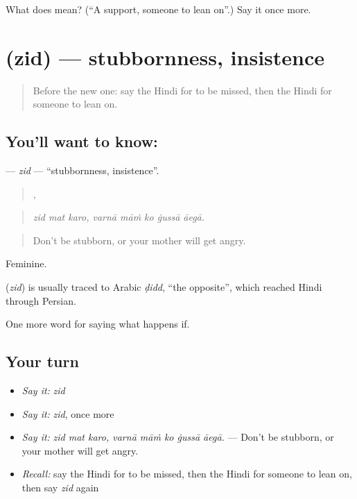 \begin{tcolorbox}[breakable,colback=teal!4,colframe=teal!35!black,title={Before you move on}]
What does  mean? (\textquotedblleft{}A support, someone to lean on\textquotedblright{}.) Say it once more.
\end{tcolorbox}
\section[\texorpdfstring{\hi{ज़िद} (zid)}{ज़िद (zid)}]{ (zid) — stubbornness, insistence}

\label{lesson:HI-C386-zid}



\begin{quote}
Before the new one: say the Hindi for to be missed, then the Hindi for someone to lean on.
\end{quote}

\subsection*{You'll want to know: }
\textbf{} — \emph{zid} — \textquotedblleft{}stubbornness, insistence\textquotedblright{}.

\begin{quote}
  ,     
\end{quote}

\begin{quote}
\emph{zid mat karo, varnā māṁ ko ġussā āegā.}
\end{quote}

\begin{quote}
Don't be stubborn, or your mother will get angry.
\end{quote}

Feminine.

\begin{cousinweb}
\textbf{} (\emph{zid}) is usually traced to Arabic \emph{ḍidd}, \textquotedblleft{}the opposite\textquotedblright{}, which reached Hindi through Persian.
\end{cousinweb}

\begin{grammarlens}[title={What you've built}]
One more word for saying what happens if.
\end{grammarlens}

\subsection*{Your turn}
\begin{itemize}
\raggedright
  \item \emph{Say it:} \emph{zid}
  \item \emph{Say it:} \emph{zid}, once more
  \item \emph{Say it:} \emph{zid mat karo, varnā māṁ ko ġussā āegā.} — Don't be stubborn, or your mother will get angry.
  \item \emph{Recall:} say the Hindi for to be missed, then the Hindi for someone to lean on, then say \emph{zid} again
\end{itemize}

